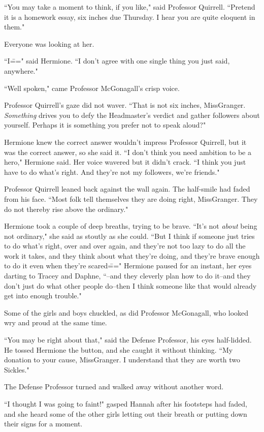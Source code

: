 ``You may take a moment to think, if you like," said Professor Quirrell. ``Pretend it is a homework essay, six inches due Thursday. I hear you are quite eloquent in them."

Everyone was looking at her.

``I\===" said Hermione. ``I don't agree with one single thing you just said, anywhere."

``Well spoken," came Professor McGonagall's crisp voice.

Professor Quirrell's gaze did not waver. ``That is not six inches, Miss\?Granger. \emph{Something} drives you to defy the Headmaster's verdict and gather followers about yourself. Perhaps it is something you prefer not to speak aloud?"

Hermione knew the correct answer wouldn't impress Professor Quirrell, but it was the correct answer, so she said it. ``I don't think you need ambition to be a hero," Hermione said. Her voice wavered but it didn't crack. ``I think you just have to do what's right. And they're not my followers, we're friends."

Professor Quirrell leaned back against the wall again. The half-smile had faded from his face. ``Most folk tell themselves they are doing right, Miss\?Granger. They do not thereby rise above the ordinary."

Hermione took a couple of deep breaths, trying to be brave. ``It's not \emph{about} being not ordinary," she said as stoutly as she could. ``But I think if someone just tries to do what's right, over and over again, and they're not too lazy to do all the work it takes, and they think about what they're doing, and they're brave enough to do it even when they're scared\===" Hermione paused for an instant, her eyes darting to Tracey and Daphne, ``\---and they cleverly plan how to do it\---and they don't just do what other people do\---then I think someone like that would already get into enough trouble."

Some of the girls and boys chuckled, as did Professor McGonagall, who looked wry and proud at the same time.

``You may be right about that," said the Defense Professor, his eyes half-lidded. He tossed Hermione the button, and she caught it without thinking. ``My donation to your cause, Miss\?Granger. I understand that they are worth two Sickles."

The Defense Professor turned and walked away without another word.

``I thought I was going to faint!" gasped Hannah after his footsteps had faded, and she heard some of the other girls letting out their breath or putting down their signs for a moment.

